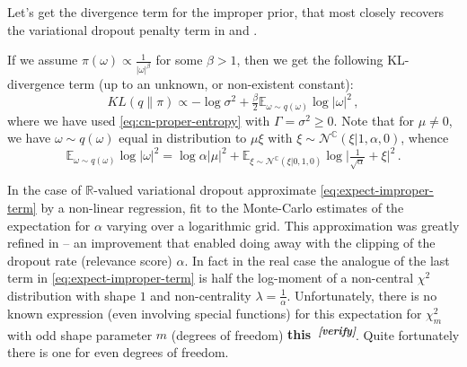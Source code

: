 \documentclass[a4paper,10pt]{article}
\newcommand{\attn}[2]{\textbf{\color{red} #2~\textsuperscript{\textit{[#1]}}}}
\newcommand{\verify}[1]{\attn{verify}{#1}}
\newcommand{\real}{\mathbb{R}}
\newcommand{\cplx}{\mathbb{C}}
\begin{document}
Let's get the divergence term for the improper prior, that most closely recovers the variational
dropout penalty term in \cite{kingma_variational_2015} and \cite{molchanov_variational_2017}.

If we assume $
  \pi(\omega) \propto \tfrac1{\lvert \omega \rvert^\beta}
$ for some $\beta > 1$, then we get the following KL-divergence term (up to an unknown, or
non-existent constant):
\begin{equation}  \label{eq:var-do-kl-div-raw}
KL(q\| \pi)
  \propto
    - \log{\sigma^2}
    + \tfrac{\beta}2 \mathbb{E}_{\omega \sim q(\omega)} \log \lvert \omega \rvert^2
  \,,
\end{equation}
where we have used \eqref{eq:cn-proper-entropy} with $\Gamma = \sigma^2 \geq 0$. Note
that for $\mu \neq 0$, we have $\omega \sim q(\omega)$ equal in distribution to $\mu \xi$
with $\xi \sim \mathcal{N}^{\cplx}(\xi \vert 1, \alpha, 0)$, whence
\begin{equation}  \label{eq:expect-improper-term}
\mathbb{E}_{\omega \sim q(\omega)} \log \lvert \omega \rvert^2
  = \log \alpha \lvert \mu \rvert^2
    + \mathbb{E}_{\xi \sim \mathcal{N}^{\cplx}(\xi \vert 0, 1, 0)}
        \log{\bigl\lvert \tfrac1{\sqrt{\alpha}} + \xi \bigr\rvert^2}
  \,.
\end{equation}

In the case of $\real$-valued variational dropout \cite{kingma_variational_2015} approximate
\eqref{eq:expect-improper-term} by a non-linear regression, fit to the Monte-Carlo estimates
of the expectation for $\alpha$ varying over a logarithmic grid. This approximation was greatly
refined in \cite{molchanov_variational_2017} -- an improvement that enabled doing away with
the clipping of the dropout rate (relevance score) $\alpha$. In fact in the real case the analogue
of the last term in \eqref{eq:expect-improper-term} is half the log-moment of a non-central
$\chi^2$ distribution with shape $1$ and non-centrality $\lambda = \tfrac1{\alpha}$. Unfortunately,
there is no known expression (even involving special functions) for this expectation for
$\chi^2_m$ with odd shape parameter $m$ (degrees of freedom) \verify{this}. Quite fortunately
there is one for even degrees of freedom.
\end{document}
